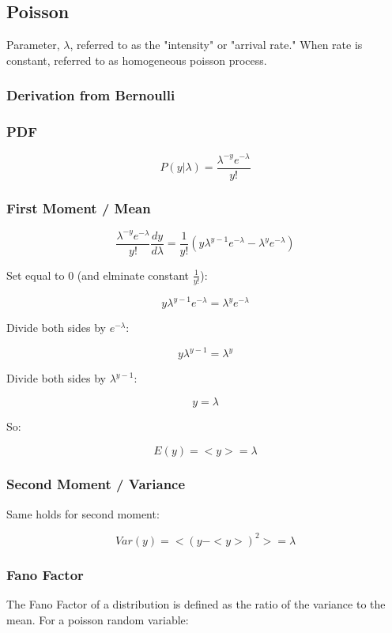 \documentclass[../doc.tex]{subfiles}
\begin{document}
\subsection{Poisson}

Parameter, $\lambda$, referred to as the "intensity" or "arrival rate." When rate is constant, referred to as homogeneous poisson process.

\subsubsection{Derivation from Bernoulli}

\subsubsection{PDF}
\[
P(y | \lambda) = \frac{\lambda^{-y} e^{-\lambda}}{y!}
\]

\subsubsection{First Moment / Mean}

\[
\frac{\lambda^{-y} e^{-\lambda}}{y!} \frac{dy}{d\lambda} = \frac{1}{y!}( y \lambda^{y-1}e^{-\lambda} - \lambda^{y} e^{-\lambda} )
\]

Set equal to 0 (and elminate constant $\frac{1}{y!}$):

\[
y \lambda^{y-1}e^{-\lambda} = \lambda^{y}e^{-\lambda}
\]

Divide both sides by $e^{-\lambda}$:

\[
y \lambda^{y-1} = \lambda^{y}
\]

Divide both sides by $\lambda^{y-1}$:

\[
y = \lambda
\]

So:

\[
E(y) = <y> = \lambda
\]

\subsubsection{Second Moment / Variance}

Same holds for second moment:

\[
Var(y) = < (y - <y>)^2 > = \lambda
\]

\subsubsection{Fano Factor}

The Fano Factor of a distribution is defined as the ratio of the variance to the mean. For a poisson random variable:
\end{document}

